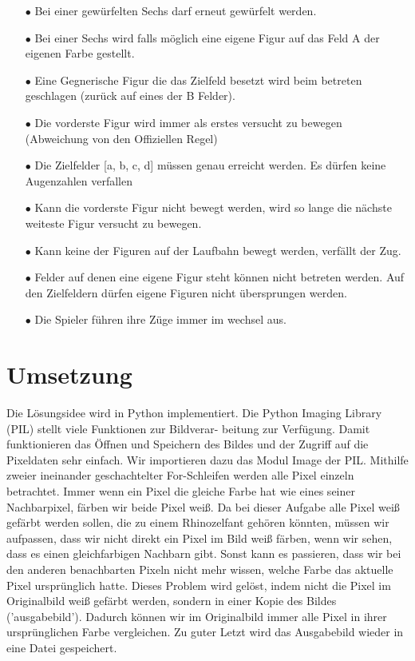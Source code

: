 \documentclass[a4paper,10pt,ngerman]{scrartcl}
\begin{document}
\begin{enumerate}
	
	\item [$\bullet$] Bei einer gewürfelten Sechs darf erneut gewürfelt werden.
	\item [$\bullet$]Bei einer Sechs wird falls möglich eine eigene Figur auf das Feld A der eigenen Farbe gestellt.
	\item [$\bullet$] Eine Gegnerische Figur die das Zielfeld besetzt wird beim betreten geschlagen (zurück auf eines der B Felder).
	\item [$\bullet$] Die vorderste Figur wird immer als erstes versucht zu bewegen (Abweichung von den Offiziellen Regel)
	\item [$\bullet$] Die Zielfelder [a, b, c, d] müssen genau erreicht werden. Es dürfen keine \glqq Augenzahlen \grqq verfallen
	\item [$\bullet$] Kann die vorderste Figur nicht bewegt werden, wird so lange die nächste weiteste Figur versucht zu bewegen.
	\item [$\bullet$] Kann keine der Figuren auf der \glqq Laufbahn \grqq bewegt werden, verfällt der Zug.
	\item [$\bullet$] Felder auf denen eine eigene Figur steht können nicht betreten werden. Auf den Zielfeldern dürfen eigene Figuren nicht übersprungen werden.
	\item [$\bullet$] Die Spieler führen ihre Züge immer im wechsel aus.
\end{enumerate}


\section{Umsetzung}
Die Lösungsidee wird in Python implementiert. Die Python Imaging Library (PIL) stellt viele Funktionen zur Bildverar- beitung zur Verfügung. Damit funktionieren das Öffnen und 
Speichern des Bildes und der Zugriff auf die Pixeldaten sehr einfach. Wir importieren dazu das Modul Image der PIL. Mithilfe zweier ineinander geschachtelter For-Schleifen 
werden alle Pixel einzeln betrachtet. Immer wenn ein Pixel die gleiche Farbe hat wie eines seiner Nachbarpixel, färben wir beide Pixel weiß. Da bei dieser Aufgabe alle Pixel weiß gefärbt werden sollen, die zu einem Rhinozelfant gehören könnten, müssen wir aufpassen, dass wir nicht direkt ein Pixel im Bild weiß färben, wenn wir sehen, dass es einen gleichfarbigen Nachbarn 
gibt. Sonst kann es passieren, dass wir bei den anderen benachbarten Pixeln nicht mehr wissen, welche Farbe das aktuelle Pixel ursprünglich hatte. Dieses Problem wird 
gelöst, indem nicht die Pixel im Originalbild weiß gefärbt werden, sondern in einer Kopie des Bildes ('ausgabebild'). Dadurch können wir im Originalbild immer alle Pixel in ihrer 
ursprünglichen Farbe vergleichen. Zu guter Letzt wird das Ausgabebild wieder in eine Datei 
gespeichert. 
\end{document}

